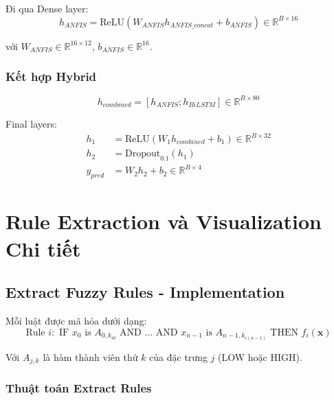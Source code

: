 \documentclass[12pt,a4paper]{article}
\begin{document}
Đi qua Dense layer:
\begin{equation}
h_{ANFIS} = \text{ReLU}(W_{ANFIS} h_{ANFIS\_concat} + b_{ANFIS}) \in \mathbb{R}^{B \times 16}
\end{equation}

với $W_{ANFIS} \in \mathbb{R}^{16 \times 12}$, $b_{ANFIS} \in \mathbb{R}^{16}$.

\subsubsection{Kết hợp Hybrid}

\begin{equation}
h_{combined} = [h_{ANFIS}; h_{BiLSTM}] \in \mathbb{R}^{B \times 80}
\end{equation}

Final layers:
\begin{align}
h_1 &= \text{ReLU}(W_1 h_{combined} + b_1) \in \mathbb{R}^{B \times 32} \\
h_2 &= \text{Dropout}_{0.1}(h_1) \\
y_{pred} &= W_2 h_2 + b_2 \in \mathbb{R}^{B \times 4}
\end{align}

\section{Rule Extraction và Visualization Chi tiết}

\subsection{Extract Fuzzy Rules - Implementation}

Mỗi luật được mã hóa dưới dạng:
\begin{equation}
\text{Rule } i: \text{ IF } x_0 \text{ is } A_{0,k_{i0}} \text{ AND } \ldots \text{ AND } x_{n-1} \text{ is } A_{n-1,k_{i(n-1)}} \text{ THEN } f_i(\mathbf{x})
\end{equation}

Với $A_{j,k}$ là hàm thành viên thứ $k$ của đặc trưng $j$ (LOW hoặc HIGH).

\subsubsection{Thuật toán Extract Rules}
\end{document}
